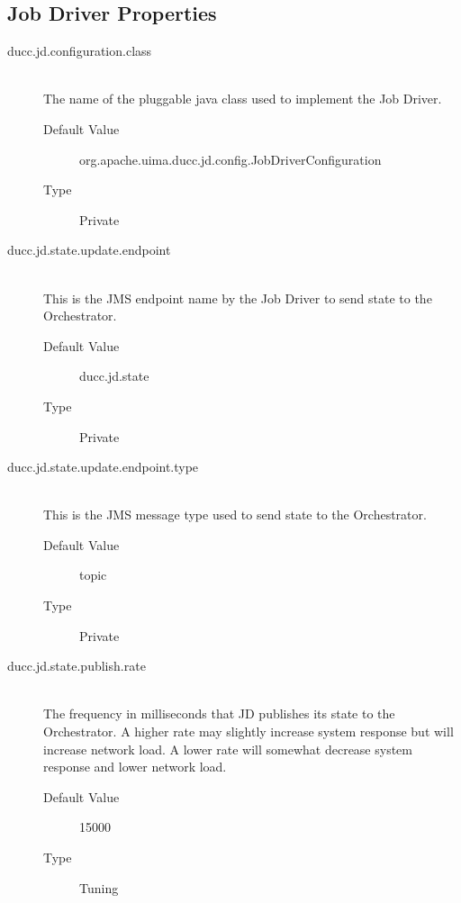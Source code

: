 \subsection{Job Driver Properties}
    \begin{description}
        \item[ducc.jd.configuration.class] \hfill \\
          The name of the pluggable java class used to implement the Job Driver. 
          \begin{description}
            \item[Default Value] org.apache.uima.ducc.jd.config.JobDriverConfiguration 
            \item[Type] Private 
          \end{description}
          
        \item[ducc.jd.state.update.endpoint] \hfill \\
          This is the JMS endpoint name by the Job Driver to send state to the Orchestrator. 
          \begin{description}
            \item[Default Value] ducc.jd.state               
            \item[Type] Private 
          \end{description}
            

        \item[ducc.jd.state.update.endpoint.type] \hfill \\
          This is the JMS message type used to send state to the Orchestrator. 
          \begin{description}            
            \item[Default Value] topic 
            \item[Type] Private 
          \end{description}
          

        \item[ducc.jd.state.publish.rate] \hfill \\
          The frequency in milliseconds that JD publishes its state to the Orchestrator. A higher rate 
          may slightly increase system response but will increase network load. A lower rate will 
          somewhat decrease system response and lower network load. 
          \begin{description}
            \item[Default Value] 15000 
            \item[Type] Tuning 
          \end{description}


\end{description}
